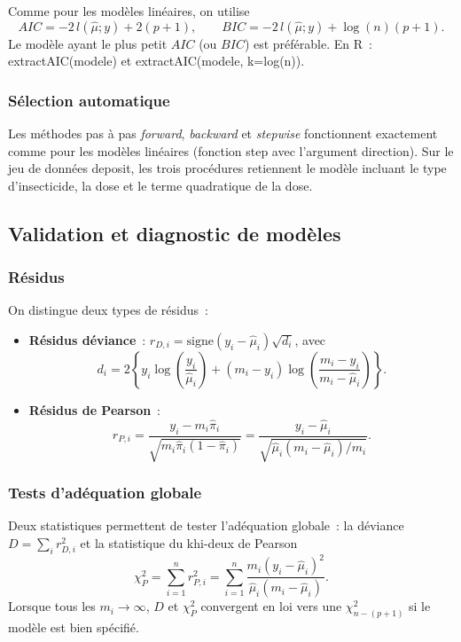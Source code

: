 \documentclass[11pt,letterpaper]{article}
\begin{document}
Comme pour les modèles linéaires, on utilise
$$AIC = -2\,l(\hat\mu;y) + 2(p+1), \qquad BIC = -2\,l(\hat\mu;y) + \log(n)(p+1).$$
Le modèle ayant le plus petit $AIC$ (ou $BIC$) est préférable. En \textrm{R}~: \textsf{extractAIC(modele)} et \textsf{extractAIC(modele, k=log(n))}.

\subsubsection{Sélection automatique}

Les méthodes pas à pas \textit{forward}, \textit{backward} et \textit{stepwise} fonctionnent exactement comme pour les modèles linéaires (fonction \textsf{step} avec l'argument \textsf{direction}). Sur le jeu de données \textsf{deposit}, les trois procédures retiennent le modèle incluant le type d'insecticide, la dose et le terme quadratique de la dose.

\subsection{Validation et diagnostic de modèles}

\subsubsection{Résidus}

On distingue deux types de résidus~:
\begin{itemize}
\item \textbf{Résidus déviance}~: $r_{D,i} = \mathrm{signe}(y_i - \hat\mu_i)\sqrt{d_i}$, avec
$$d_i = 2\left\{y_i\log\!\left(\frac{y_i}{\hat\mu_i}\right) + (m_i - y_i)\log\!\left(\frac{m_i - y_i}{m_i - \hat\mu_i}\right)\right\}.$$
\item \textbf{Résidus de Pearson}~:
$$r_{P,i} = \frac{y_i - m_i\hat\pi_i}{\sqrt{m_i\hat\pi_i(1-\hat\pi_i)}} = \frac{y_i - \hat\mu_i}{\sqrt{\hat\mu_i(m_i-\hat\mu_i)/m_i}}.$$
\end{itemize}

\subsubsection{Tests d'adéquation globale}

Deux statistiques permettent de tester l'adéquation globale~: la déviance $D = \sum_i r_{D,i}^2$ et la statistique du khi-deux de Pearson
$$\chi^2_P = \sum_{i=1}^n r_{P,i}^2 = \sum_{i=1}^n \frac{m_i(y_i - \hat\mu_i)^2}{\hat\mu_i(m_i - \hat\mu_i)}.$$
Lorsque tous les $m_i \to \infty$, $D$ et $\chi^2_P$ convergent en loi vers une $\chi^2_{n-(p+1)}$ si le modèle est bien spécifié.
\end{document}
